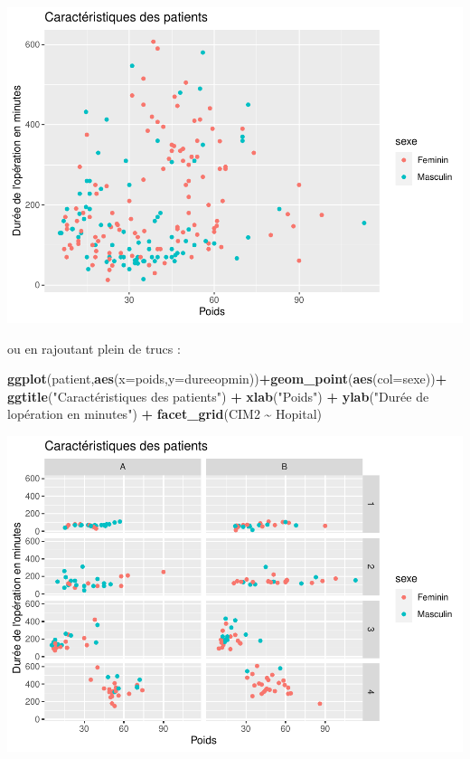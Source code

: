 \documentclass[
]{book}
\newenvironment{Shaded}{\begin{snugshade}}{\end{snugshade}}
\newcommand{\AttributeTok}[1]{\textcolor[rgb]{0.13,0.29,0.53}{#1}}
\newcommand{\FunctionTok}[1]{\textcolor[rgb]{0.13,0.29,0.53}{\textbf{#1}}}
\newcommand{\NormalTok}[1]{#1}
\newcommand{\SpecialCharTok}[1]{\textcolor[rgb]{0.81,0.36,0.00}{\textbf{#1}}}
\newcommand{\StringTok}[1]{\textcolor[rgb]{0.31,0.60,0.02}{#1}}
\begin{document}
\includegraphics{_main_files/figure-latex/ggplot15-1.pdf}

ou en rajoutant plein de trucs :

\begin{Shaded}
\begin{Highlighting}[]
\FunctionTok{ggplot}\NormalTok{(patient,}\FunctionTok{aes}\NormalTok{(}\AttributeTok{x=}\NormalTok{poids,}\AttributeTok{y=}\NormalTok{dureeopmin))}\SpecialCharTok{+}\FunctionTok{geom\_point}\NormalTok{(}\FunctionTok{aes}\NormalTok{(}\AttributeTok{col=}\NormalTok{sexe))}\SpecialCharTok{+}
  \FunctionTok{ggtitle}\NormalTok{(}\StringTok{"Caractéristiques des patients"}\NormalTok{) }\SpecialCharTok{+} 
  \FunctionTok{xlab}\NormalTok{(}\StringTok{"Poids"}\NormalTok{) }\SpecialCharTok{+} 
  \FunctionTok{ylab}\NormalTok{(}\StringTok{"Durée de l\textquotesingle{}opération en minutes"}\NormalTok{) }\SpecialCharTok{+}
  \FunctionTok{facet\_grid}\NormalTok{(CIM2 }\SpecialCharTok{\textasciitilde{}}\NormalTok{ Hopital)}
\end{Highlighting}
\end{Shaded}

\includegraphics{_main_files/figure-latex/ggplot16-1.pdf}
\end{document}
